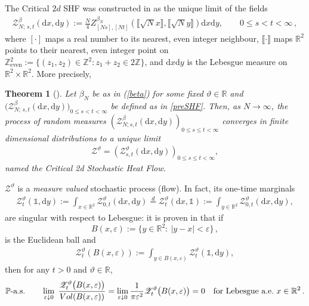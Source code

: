 \documentclass[a4paper,reqno,11pt]{amsart}
\numberwithin{equation}{section}
\theoremstyle{mytheorem}
\newtheorem{theorem}{Theorem}[section]
\newcommand{\bbP}{{\ensuremath{\mathbb P}} }
\newcommand{\bbR}{{\ensuremath{\mathbb R}} }
\newcommand{\bbZ}{{\ensuremath{\mathbb Z}} }
\newcommand{\cZ}{{\ensuremath{\mathcal Z}} }
\newcommand{\gb}{\beta}
\newcommand{\gt}{\vartheta}
\newcommand{\R}{\mathbb{R}}
\newcommand{\ind}{\mathds{1}}
\renewcommand{\epsilon}{\varepsilon}
\renewcommand{\theta}{\vartheta}
\newcommand\ra{\left(}
\newcommand\rb{\right)}
\newcommand\dd{\mathrm{d}}
\newcommand{\f}{\frac}
\begin{document}
The Critical $2d$ SHF was constructed in \cite{CSZ23a}  as the unique limit of the fields
\begin{align}\label{preSHF}
    \cZ_{N; \,s,t}^\beta(\dd x, \dd y):=
    \f{N}{4}
    Z _{[  Ns ],[ Nt ]}^{\gb_N}
    \ra
    \llbracket   \sqrt{N}x    \rrbracket
    ,
    \llbracket   \sqrt{N}y   \rrbracket
    \rb
    \dd x \dd y, \qquad 0\le s<t<\infty \,,
\end{align}
where $[\cdot]$ maps a real number to its nearest, even integer neighbour, $\llbracket\cdot\rrbracket$ maps $\bbR^2$ points to 
their nearest, even integer point on $\bbZ^2_\text{even}:=\{ (z_1,z_2)\in\bbZ^2:z_1+z_2\in 2\bbZ \}$, and $\dd x  \dd y$ is the Lebesgue measure on $\bbR^2 \times \bbR^2$.
More precisely,
\begin{theorem}[\cite{CSZ23a}]
    Let $\gb_N$ be as in (\ref{beta}) for some fixed $\gt\in\bbR$ and $\big( \cZ_{N; \,s,t}^\beta(\dd x, \dd y) \big)_{0\le s<t<\infty}$ 
    be defined as in \eqref{preSHF}. Then, as $N\rightarrow\infty$, the process of random measures 
    $(\cZ_{N; s,t}^{\gb}(\dd x,\dd y))_{0\le s\le t<\infty}$ converges in finite dimensional distributions to a unique limit
    \begin{align*}
        \mathscr{Z}^\gt
        =
        (\mathscr{Z}_{s,t}^{\gt}(\dd x,\dd y))_{0\le s\le t<\infty},
    \end{align*}
    named the Critical 2d Stochastic Heat Flow.
\end{theorem}
$\mathscr{Z}^\gt$ is a {\it measure valued} stochastic process (flow). In fact, its one-time marginals 
\begin{align}\label{one-time}
\mathscr{Z}_t^\theta(\ind, \dd y):=\int_{x\in \R^2} \mathscr{Z}_{0,t}^\theta(\dd x, \dd y)
 \stackrel{d}{=}
 \mathscr{Z}_t^\theta(\dd x, \ind):=\int_{y\in \R^2} \mathscr{Z}_{0,t}^\theta(\dd x, \dd y),
\end{align}
 are singular with respect to Lebesgue: it is proven in \cite{CSZ25} that if
\begin{equation}\label{eq:uniform}
		B(x,\epsilon) := \big\{y \in \R^2 \colon \ |y-x| < \epsilon \big\} \,,
\end{equation}
is the Euclidean ball and 
\begin{align}\label{eq:averaged-SHF}
	\mathscr{Z}_{t}^\theta(B(x,\epsilon))
	:= \int_{y\in B(x,\epsilon) } \mathscr{Z}_t^\theta(\ind, \dd y),
\end{align}
then for any $t > 0$ and $\theta \in \R$, 
\begin{equation}\label{eq:singularity-SHF}
	\text{$\bbP$-a.s.} \qquad
	\lim_{\epsilon \downarrow 0} \; \frac{\mathscr{Z}_{t}^\theta\big(B(x,\epsilon)\big)}{{\rm Vol}(B(x,\epsilon))}
	=\lim_{\epsilon \downarrow 0} \frac{1}{\pi \epsilon^2} \mathscr{Z}_{t}^\theta\big(B(x,\epsilon)\big)
	=0
	\quad \text{for Lebesgue a.e.\ $x\in\R^2$} \,.
\end{equation}
\end{document}
